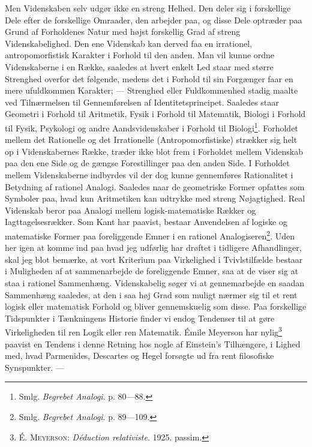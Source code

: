 \documentclass[12pt]{article}
\newcommand{\opage}[1]{\marginnote{\footnotesize\textit{[#1]}}}
\begin{document}
Men Videnskaben selv udgør ikke en streng Helhed. Den deler sig i
forskellige Dele efter de forskellige Omraader, den arbejder paa, og
disse Dele optræder paa Grund af Forholdenes Natur med højst
forskellig Grad af streng Videnskabelighed. Den ene Videnskab kan
derved faa en irrationel, \guillemotright{}antropomorfistisk\guillemotleft{} Karakter i Forhold til
den anden. Man vil kunne ordne Videnskaberne i en Række,
\setcounter{footnote}{0}%
\opage{11}saaledes at hvert enkelt Led staar med større Strenghed overfor
det følgende, medens det i Forhold til sin Forgænger faar en mere
ufuldkommen Karakter; --- Strenghed eller Fuldkommenhed stadig maalte
ved Tilnærmelsen til Gennemførelsen af Identitetsprincipet. Saaledes
staar Geometri i Forhold til Aritmetik, Fysik i Forhold til
Matematik, Biologi i Forhold til Fysik, Psykologi og andre
Aandsvidenskaber i Forhold til Biologi\footnote{Smlg.
\textit{Begrebet Analogi}. p. 80---88.}. Forholdet mellem det
Rationelle og det Irrationelle (Antropomorfistiske) strækker sig helt
op i Videnskabernes Række, træder ikke blot frem i Forholdet mellem
Videnskab paa den ene Side og de gængse Forestillinger paa den anden
Side. I Forholdet mellem Videnskaberne indbyrdes vil der dog kunne
gennemføres Rationalitet i Betydning af rationel Analogi. Saaledes
naar de geometriske Former opfattes som Symboler paa, hvad kun
Aritmetiken kan udtrykke med streng Nøjagtighed. Real Videnskab beror
paa Analogi mellem logisk-matematiske Rækker og Iagttagelsesrækker.
Som Kant har paavist, bestaar \guillemotright{}Anvendelsen\guillemotleft{} af logiske og matematiske
Former paa foreliggende Emner i en rationel
Analogiseren\footnote{Smlg. \textit{Begrebet Analogi}. p. 89---109.}.
Uden her igen at komme ind paa hvad jeg udførlig har drøftet i
tidligere Afhandlinger, skal jeg blot bemærke, at vort Kriterium paa
Virkelighed i Tvivlstilfælde bestaar i Muligheden af at sammenarbejde
de foreliggende Emner, saa at de viser sig at staa i rationel
Sammenhæng. Videnskabelig søger vi at gennemarbejde en saadan
Sammenhæng saaledes, at den i saa høj Grad som muligt nærmer sig til
et rent logisk eller matematisk Forhold og bliver gennemskuelig som
disse. Paa forskellige Tidspunkter i Tænkningens Historie finder vi
endog Tendenser til at gøre Virkeligheden til ren Logik eller ren
Matematik.
\setcounter{footnote}{0}%
\opage{12}Émile Meyerson har nylig\footnote{\textsc{É. Meyerson}:
\textit{Déduction relativiste}. 1925. passim.} paavist en Tendens i
denne Retning hos nogle af Einstein's Tilhængere, i Lighed med, hvad
Parmenides, Descartes og Hegel forsøgte ud fra rent filosofiske
Synspunkter. ---
\end{document}
